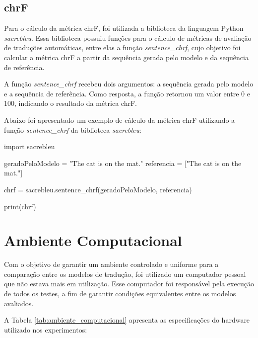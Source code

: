 \subsection{chrF}

Para o cálculo da métrica chrF, foi utilizada a biblioteca da linguagem Python \textit{sacrebleu}. Essa biblioteca possuiu funções para o cálculo de métricas de avaliação de traduções automáticas, entre elas a função \textit{sentence\_chrf}, cujo objetivo foi calcular a métrica chrF a partir da sequência gerada pelo modelo e da sequência de referência.

A função \textit{sentence\_chrf} recebeu dois argumentos: a sequência gerada pelo modelo e a sequência de referência. Como resposta, a função retornou um valor entre 0 e 100, indicando o resultado da métrica chrF.

Abaixo foi apresentado um exemplo de cálculo da métrica chrF utilizando a função \textit{sentence\_chrf} da biblioteca \textit{sacrebleu}:
\\
\begin{listing}
\begin{python}
import sacrebleu

geradoPeloModelo = "The cat is on the mat."
referencia = ["The cat is on the mat."]

chrf = sacrebleu.sentence_chrf(geradoPeloModelo, referencia)

print(chrf)

\end{python}
\caption{Exemplo de cálculo da métrica chrF com a biblioteca sacrebleu}
\label{code:chrf_example}
\end{listing}

\section{Ambiente Computacional}

Com o objetivo de garantir um ambiente controlado e uniforme para a comparação entre os modelos de tradução, foi utilizado um computador pessoal que não estava mais em utilização. Esse computador foi responsável pela execução de todos os testes, a fim de garantir condições equivalentes entre os modelos avaliados.

A Tabela \ref{tab:ambiente_computacional} apresenta as especificações do hardware utilizado nos experimentos:

